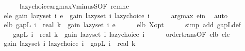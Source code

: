 \begin{isabellebody}
\ \ \ \ \isamarkupfalse%
\ lazy{\isacharunderscore}{\kern0pt}choice{\isacharunderscore}{\kern0pt}argmax{\isacharunderscore}{\kern0pt}V{\isacharunderscore}{\kern0pt}minus{\isacharunderscore}{\kern0pt}S{\isacharbrackleft}{\kern0pt}OF\ rem{\isacharunderscore}{\kern0pt}ne{\isacharbrackright}{\kern0pt}\ \isakeywordONE{{\isachardot}{\kern0pt}}\isamarkupfalse%
\isanewline
\isanewline
\ \ \isamarkupfalse%
\ e{\isacharunderscore}{\kern0pt}le{\isacharcolon}{\kern0pt}\ {\isachardoublequoteopen}gain\ {\isacharparenleft}{\kern0pt}lazy{\isacharunderscore}{\kern0pt}set\ i{\isacharparenright}{\kern0pt}\ e\ {\isasymle}\ gain\ {\isacharparenleft}{\kern0pt}lazy{\isacharunderscore}{\kern0pt}set\ i{\isacharparenright}{\kern0pt}\ {\isacharparenleft}{\kern0pt}lazy{\isacharunderscore}{\kern0pt}choice\ i{\isacharparenright}{\kern0pt}{\isachardoublequoteclose}\isanewline
\ \ \ \ \isamarkupfalse%
\ argmax\ e{\isacharunderscore}{\kern0pt}in\ \isamarkupfalse%
\ auto\isanewline
\isanewline
\ \ \isamarkupfalse%
\ e{\isacharunderscore}{\kern0pt}lb{\isacharprime}{\kern0pt}{\isacharcolon}{\kern0pt}\ {\isachardoublequoteopen}gapL\ i\ {\isacharslash}{\kern0pt}\ real\ k\ {\isasymle}\ gain\ {\isacharparenleft}{\kern0pt}lazy{\isacharunderscore}{\kern0pt}set\ i{\isacharparenright}{\kern0pt}\ e{\isachardoublequoteclose}\isanewline
\ \ \ \ \isamarkupfalse%
\ e{\isacharunderscore}{\kern0pt}lb\ X{\isacharunderscore}{\kern0pt}opt\isanewline
\ \ \ \ \isamarkupfalse%
\ {\isacharparenleft}{\kern0pt}simp\ add{\isacharcolon}{\kern0pt}\ gapL{\isacharunderscore}{\kern0pt}def{\isacharparenright}{\kern0pt}\isanewline
\isanewline
\ \ \isamarkupfalse%
\ {\isachardoublequoteopen}gapL\ i\ {\isacharslash}{\kern0pt}\ real\ k\ {\isasymle}\ gain\ {\isacharparenleft}{\kern0pt}lazy{\isacharunderscore}{\kern0pt}set\ i{\isacharparenright}{\kern0pt}\ {\isacharparenleft}{\kern0pt}lazy{\isacharunderscore}{\kern0pt}choice\ i{\isacharparenright}{\kern0pt}{\isachardoublequoteclose}\isanewline
\ \ \ \ \isamarkupfalse%
\ order{\isacharunderscore}{\kern0pt}trans{\isacharbrackleft}{\kern0pt}OF\ e{\isacharunderscore}{\kern0pt}lb{\isacharprime}{\kern0pt}\ e{\isacharunderscore}{\kern0pt}le{\isacharbrackright}{\kern0pt}\ \isakeywordONE{{\isachardot}{\kern0pt}}\isamarkupfalse%
\isanewline
\isanewline
\ \ \isamarkupfalse%
\ {\isachardoublequoteopen}gain\ {\isacharparenleft}{\kern0pt}lazy{\isacharunderscore}{\kern0pt}set\ i{\isacharparenright}{\kern0pt}\ {\isacharparenleft}{\kern0pt}lazy{\isacharunderscore}{\kern0pt}choice\ i{\isacharparenright}{\kern0pt}\ {\isasymge}\ gapL\ i\ {\isacharslash}{\kern0pt}\ real\ k{\isachardoublequoteclose}\isanewline

\end{isabellebody}
